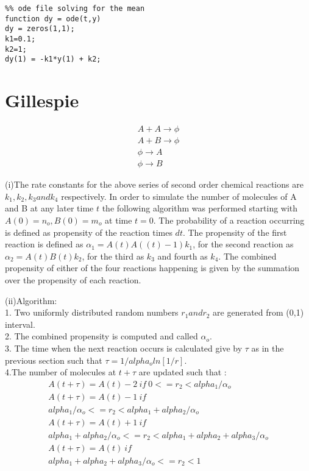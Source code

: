 \documentclass[10 pt]{article}
\begin{document}
\begin{multicols}{2}
\begin{lstlisting}
%% ode file solving for the mean
function dy = ode(t,y)
dy = zeros(1,1);
k1=0.1;
k2=1; 
dy(1) = -k1*y(1) + k2;
\end{lstlisting}
\section{Gillespie}
\begin{align}
A+A\rightarrow \phi \\ A+B\rightarrow \phi \\ \phi \rightarrow A \\ \phi \rightarrow B
\end{align}
\begin{flushleft}
(i)The rate constants for the above series of second order chemical reactions are $k_1,k_2,k_3 and k_4$ respectively. In order to simulate the number of molecules of A and B at any later time $t$ the following algorithm was performed starting with $A(0) = n_o , B(0) = m_o$ at time $t = 0$. The probability of a reaction occurring is defined as propensity of the reaction times $dt$. The propensity of the first reaction is defined as $\alpha_1= A(t)A((t)-1)k_1$, for the second reaction as $\alpha_2=A(t)B(t)k_2$, for the third as $k_3$ and fourth as $k_4$. The combined propensity of either of the four reactions happening is given by the summation over the propensity of each reaction.
\end{flushleft}

(ii)Algorithm:\\
1. Two uniformly distributed random numbers $r_1 and r_2$ are generated from (0,1) interval.\\
2. The combined propensity is computed and called $\alpha_o$.\\
3. The time when the next reaction occurs is calculated give by $\tau$ as in the previous section such that $ \tau=1/alpha_o ln[1/r]$.\\
4.The number of molecules at $t + \tau$ are updated such that : \\
\begin{multline*}	
A(t+\tau) = A(t) - 2 \: if \: 0 <= r_2< alpha_1/\alpha_o \\
A(t+\tau) = A(t) - 1 \: if \: \\ alpha_1/\alpha_o<= r_2< alpha_1+alpha_2/\alpha_o\\
A(t+\tau) = A(t) + 1 \: if \: \\ alpha_1+alpha_2/\alpha_o<= r_2< alpha_1+alpha_2+alpha_3/\alpha_o\\	
A(t+\tau) = A(t) 	\: if \: \\ alpha_1+alpha_2+alpha_3/\alpha_o<= r_2< 1 \\
\end{multline*}


\end{multicols}
\end{document}
